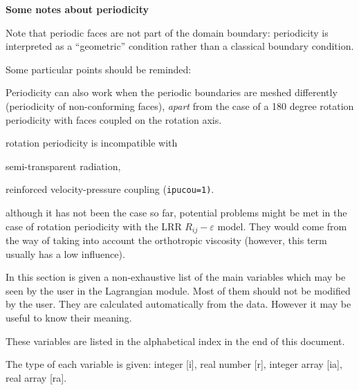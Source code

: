 {{{{\bf Some notes about periodicity}

Note that periodic faces are not part of the domain boundary:
periodicity is interpreted as a ``geometric'' condition
rather than a classical boundary condition.

Some particular points should be reminded:
\begin{list}{-}{}
\item Periodicity can also work when the periodic boundaries are meshed
      differently (periodicity of non-conforming faces), {\it apart} from
      the case of a 180 degree rotation periodicity with faces coupled
      on the rotation axis.
\item rotation periodicity is incompatible with
  \begin{list}{-}{}
  \item semi-transparent radiation,
  \item reinforced velocity-pressure coupling (\texttt{ipucou=1)}.
  \end{list}
\item although it has not been the case so far, potential problems might be met
      in the case of rotation periodicity with the LRR $R_{ij}-\varepsilon$
      model. They would come from the way of taking into account the
      orthotropic viscosity (however, this term usually has a low influence).
\end{list}


In this section is given a non-exhaustive list of the main variables
which may be seen by the user in the Lagrangian module. Most of them
should not be modified by the user. They are calculated automatically
from the data. However it may be useful to know their meaning.

\noindent
These variables are listed in the alphabetical index in the end of this
document.

\noindent
The type of each variable is given: integer [i], real number [r],
integer array [ia], real array [ra].



}}}
